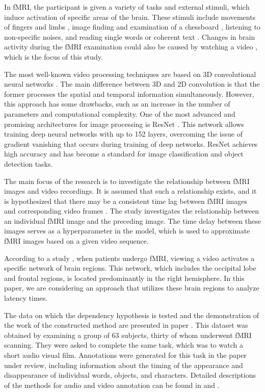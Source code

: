 \documentclass[sn-mathphys-num]{sn-jnl}%
\theoremstyle{thmstyleone}%
\theoremstyle{thmstyletwo}%
\theoremstyle{thmstylethree}%
\begin{document}
In fMRI, the participant is given a variety of tasks and external stimuli, which induce activation of specific areas of the brain. These stimuli include movements of fingers and limbs \cite{Roux1998, Papke1999}, image finding and examination of a chessboard \cite{Engel1994, Schneider1994}, listening to non-specific noises, and reading single words or coherent text \cite{Binder1994, Dymarkowski1998}. Changes in brain activity during the fMRI examination could also be caused by watching a video  \cite{decety1997brain}, which is the focus of this study.

The most well-known video processing techniques are based on 3D convolutional neural networks \cite{tran2015learning}. The main difference between 3D and 2D convolution is that the former processes the spatial and temporal information simultaneously. However, this approach has some drawbacks, such as an increase in the number of parameters and computational complexity. One of the most advanced and promising architectures for image processing is ResNet \cite{he2015deep}. This network allows training deep neural networks with up to 152 layers, overcoming the issue of gradient vanishing that occurs during training of deep networks. ResNet achieves high accuracy and has become a standard for image classification and object detection tasks.

The main focus of the research is to investigate the relationship between fMRI images and video recordings. It is assumed that such a relationship exists, and it is hypothesized that there may be a consistent time lag between fMRI images and corresponding video frames \cite{Logothetis2003}. The study investigates the relationship between an individual fMRI image and the preceding image. The time delay between these images serves as a hyperparameter in the model, which is used to approximate fMRI images based on a given video sequence.

According to a study \cite{anderson2006}, when patients undergo fMRI, viewing a video activates a specific network of brain regions. This network, which includes the occipital lobe and frontal regions, is located predominantly in the right hemisphere. In this paper, we are considering an approach that utilizes these brain regions to analyze latency times.

The data on which the dependency hypothesis is tested and the demonstration of the work of the constructed method are presented in paper \cite{Berezutskaya2022}. This dataset was obtained by examining a group of 63 subjects, thirty of whom underwent fMRI scanning. They were asked to complete the same task, which was to watch a short audio visual film. Annotations were generated for this task in the paper under review, including information about the timing of the appearance and disappearance of individual words, objects, and characters. Detailed descriptions of the methods for audio and video annotation can be found in \cite{boersma2018praat} and \cite{Berezutskaya2020}.
\end{document}
